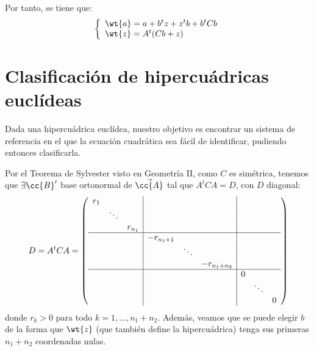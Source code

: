Por tanto, se tiene que:
\begin{equation*}
    \left\{\begin{array}{l}
        \wt{a} = a+b^tz + z^tb + b^tCb \\
        \wt{z} = A^t(Cb+z)
    \end{array}\right.
\end{equation*}


\section{Clasificación de hipercuádricas euclídeas}

Dada una hipercuádrica euclídea, nuestro objetivo es encontrar un sistema de referencia en el que la ecuación cuadrática sea fácil de identificar, pudiendo entonces clasificarla.

Por el Teorema de Sylvester visto en Geometría II, como $C$ es simétrica, tenemos que $\exists \cc{B}'$ base ortonormal de $\vec{\cc{A}}$ tal que $A^tCA=D$, con $D$ diagonal:
\begin{equation*}
    D=A^tCA = \left(
    \begin{array}{ccc|ccc|ccc}
       r_1&&&&&&&& \\
       & \ddots&&&&&&&\\
       && r_{n_1}&&&&&&\\ \hline
       &&& -r_{n_1+1}&&&&&\\
       &&&& \ddots&&&&\\
       &&&&& -r_{n_1+n_2}&&&\\ \hline
       &&&&&& 0&&\\
       &&&&&&& \ddots &\\
       &&&&&&&& 0
    \end{array}
    \right)
\end{equation*}
donde $r_k>0$ para todo $k=1,\dots,n_1+n_2$. Además, veamos que se puede elegir $b$ de la forma que $\wt{z}$ (que también define la hipercuádrica) tenga sus primeras $n_1+n_2$ coordenadas nulas.
\begin{comment}
Tenemos que $A^tz$ es un vector columna, por lo que sea $A^tz=\lm$:
\begin{equation*}
    \left(\begin{array}{c}
        0 \\ \vdots \\ 0 \\ z_{n_1+n_2+1} \\ \vdots \\ z_n
    \end{array}\right) = \wt{z}= A^tz+A^tCb = \lm+DA^tb = \left(\begin{array}{c}
        \lm_1 \\ \vdots \\ \lm_{n_1+n_2} \\ \lm_{n_1+n_2+1} \\ \vdots \\ \lm_n
    \end{array}\right)+DA^tb
\end{equation*}
\end{comment}


